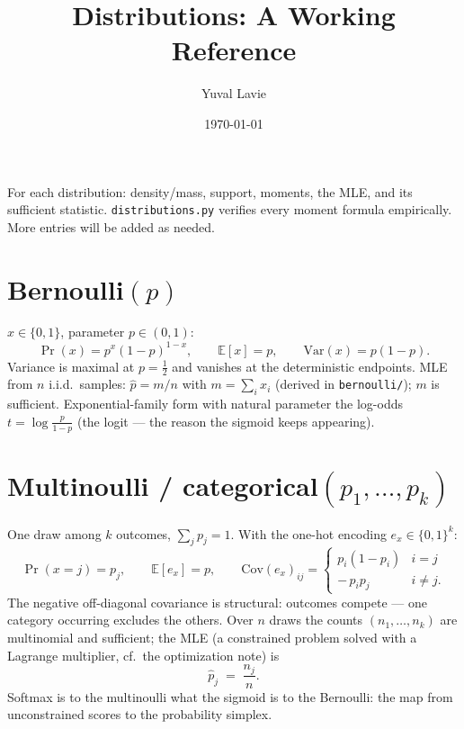 \documentclass[11pt]{article}
\title{Distributions: A Working Reference}
\author{Yuval Lavie}
\date{\today}
\begin{document}
\maketitle

\noindent
For each distribution: density/mass, support, moments, the MLE, and its
sufficient statistic. \texttt{distributions.py} verifies every moment
formula empirically. More entries will be added as needed.

\section{Bernoulli$(p)$}

$x \in \{0,1\}$, parameter $p \in (0,1)$:
\begin{equation}
  \Pr(x) = p^{x}(1-p)^{1-x},
  \qquad
  \mathbb{E}[x] = p,
  \qquad
  \mathrm{Var}(x) = p(1-p).
  \label{eq:bern}
\end{equation}
Variance is maximal at $p=\tfrac12$ and vanishes at the deterministic
endpoints. MLE from $n$ i.i.d.\ samples: $\hat p = m/n$ with
$m=\sum_i x_i$ (derived in \texttt{bernoulli/}); $m$ is sufficient.
Exponential-family form with natural parameter the log-odds
$t = \log\frac{p}{1-p}$ (the logit — the reason the sigmoid keeps
appearing).

\section{Multinoulli / categorical$(p_1,\dots,p_k)$}

One draw among $k$ outcomes, $\sum_j p_j = 1$. With the one-hot encoding
$e_x \in \{0,1\}^k$:
\begin{equation}
  \Pr(x=j) = p_j,
  \qquad
  \mathbb{E}[e_x] = p,
  \qquad
  \mathrm{Cov}(e_x)_{ij} =
  \begin{cases}
    p_i(1-p_i) & i=j\\[2pt]
    -\,p_i p_j & i\neq j .
  \end{cases}
  \label{eq:multinoulli}
\end{equation}
The negative off-diagonal covariance is structural: outcomes compete ---
one category occurring excludes the others. Over $n$ draws the counts
$(n_1,\dots,n_k)$ are multinomial and sufficient; the MLE (a constrained
problem solved with a Lagrange multiplier, cf.\ the optimization note) is
\begin{equation}
  \hat p_j \;=\; \frac{n_j}{n}.
  \label{eq:multimle}
\end{equation}
Softmax is to the multinoulli what the sigmoid is to the Bernoulli: the
map from unconstrained scores to the probability simplex.
\end{document}
